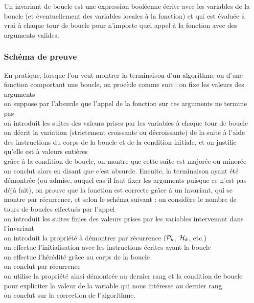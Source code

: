 			\begin{Definition}
				Un invariant de boucle est une expression booléenne écrite avec les variables de la boucle (et éventuellement des variables locales à la fonction) et qui est évaluée à vrai à chaque tour de boucle pour n'importe quel appel à la fonction avec des arguments valides.
			\end{Definition}
		
		\subsubsection{Schéma de preuve}
		
			En pratique, lorsque l'on veut montrer la terminaison d'un algorithme ou d'une fonction comportant une boucle, on procède comme suit : \nt
				 \bdot on fixe les valeurs des arguments \\
				 \bdot on suppose par l'absurde que l'appel de la fonction sur ces arguments ne termine pas \\
				 \bdot on introduit les suites des valeurs prises par les variables à chaque tour de boucle \\
				 \bdot on décrit la variation (strictement croissante ou décroissante) de la suite à l'aide des instructions du corps de la boucle et de la condition initiale, et on justifie qu'elle est à valeurs entières \\
				 \bdot grâce à la condition de boucle, on montre que cette suite est majorée ou minorée \\
				 \bdot on conclut alors en disant que c'est absurde. \nll
			Ensuite, la terminaison ayant été démontrée (ou admise, auquel cas il faut fixer les arguments puisque ce n'est pas déjà fait), on prouve que la fonction est correcte grâce à un invariant, qui se montre par récurrence, et selon le schéma suivant : \nt
				 \bdot on considère le nombre de tours de boucles effectués par l'appel \\
				 \bdot on introduit les suites finies des valeurs prises par les variables intervenant dans l'invariant \\
				 \bdot on introduit la propriété à démontrer par récurrence (\(\cal{P}_k\), \(\cal{H}_k\), etc.) \\
				 \bdot on effectue l'initialisation avec les instructions écrites avant la boucle \\
				 \bdot on effectue l'hérédité grâce au corps de la boucle \\
				 \bdot on conclut par récurrence \\
				 \bdot on utilise la propriété ainsi démontrée au dernier rang et la condition de boucle pour expliciter la valeur de la variable qui nous intéresse au dernier rang \\
				 \bdot on conclut sur la correction de l'algorithme.
			
